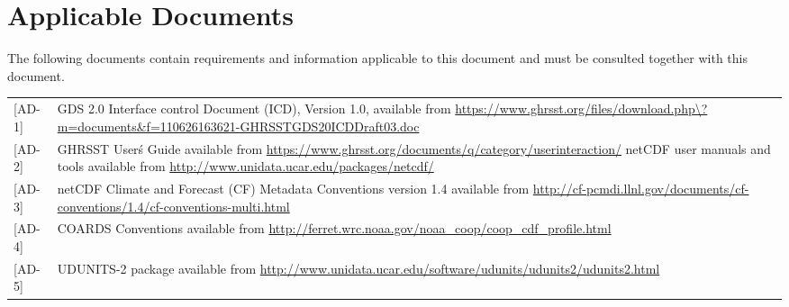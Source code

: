 \pagebreak
\section{Applicable Documents}
\par\vspace{0.5cm}
The following documents contain requirements and information applicable to this document and must
be consulted together with this document.
\par\vspace{0.5cm}

\begin{tabular}{ l p{13cm} }
[AD-1] & GDS 2.0 Interface control Document (ICD), Version 1.0, available from \url{https://www.ghrsst.org/files/download.php\?m=documents\&f=110626163621-GHRSSTGDS20ICDDraft03.doc} \\

[AD-2] & GHRSST User\'s Guide available from \url{https://www.ghrsst.org/documents/q/category/userinteraction/}
netCDF user manuals and tools available from \url{http://www.unidata.ucar.edu/packages/netcdf/} \\

[AD-3] & netCDF Climate and Forecast (CF) Metadata Conventions version 1.4 available from \url{http://cf-pcmdi.llnl.gov/documents/cf-conventions/1.4/cf-conventions-multi.html} \\

[AD-4] & COARDS Conventions available from \url{http://ferret.wrc.noaa.gov/noaa\_coop/coop\_cdf\_profile.html} \\

[AD-5] & UDUNITS-2 package available from \url{http://www.unidata.ucar.edu/software/udunits/udunits2/udunits2.html}\\
\end{tabular}
